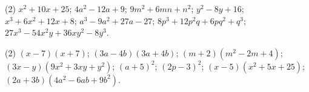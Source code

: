 \documentclass[11pt,a4paper]{scrartcl}
\begin{document}
\newpage
\answerssection

\begin{problem} \phantom{text}
\begin{tasks}[label={(\arabic*)}, label-offset=0.9em](2)
	\task $x^2+10x+25$;
	\task $4a^2-12a+9$;
	\task $9m^2+6mn+n^2$;
	\task $y^2-8y+16$;
	\task $x^3+6x^2+12x+8$;
	\task $a^3-9a^2+27a-27$;
	\task $8p^3+12p^2q+6pq^2+q^3$;
	\task $27x^3-54x^2y+36xy^2-8y^3$.
\end{tasks}
\end{problem}

\begin{problem} \phantom{text}
\begin{tasks}[label={(\arabic*)}, label-offset=0.9em](2)
	\task $(x-7)(x+7)$;
	\task $(3a-4b)(3a+4b)$;
	\task $(m+2)(m^2-2m+4)$;
	\task $(3x-y)(9x^2+3xy+y^2)$;
	\task $(a+5)^2$;
	\task $(2p-3)^2$;
	\task $(x-5)(x^2+5x+25)$;
	\task $(2a+3b)(4a^2-6ab+9b^2)$.
\end{tasks}
\end{problem}
\end{document}
